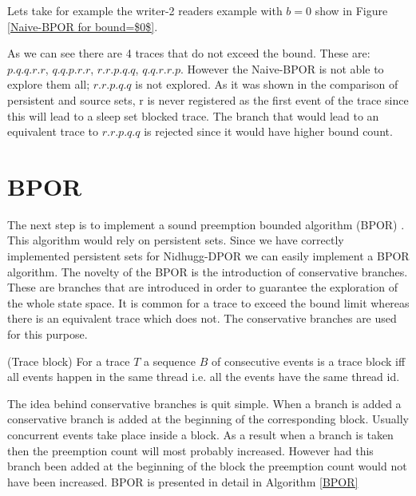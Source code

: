 Lets take for example the writer-2 readers example with $b=0$ show in Figure \ref{Naive-BPOR for bound=$0$}. 

\label{Vanilla0}    

As we can see there are 4 traces that do not exceed the bound. These are:
$p.q.q.r.r$, $q.q.p.r.r$, $r.r.p.q.q$, $q.q.r.r.p$.
However the Naive-BPOR is not able to explore them all; $r.r.p.q.q$ is not explored.
As it was shown in the comparison of persistent and source sets, r is never registered as the first event of the trace
since this will lead to a sleep set blocked trace. The branch that would lead to an equivalent trace to $r.r.p.q.q$ is rejected
since it would have higher bound count.

\section{BPOR}

The next step is to implement a sound preemption bounded algorithm (BPOR) \cite{BPOR}. This algorithm would rely on persistent sets.
Since we have correctly implemented persistent sets for Nidhugg-DPOR we can easily implement a BPOR algorithm. The novelty of the BPOR is the introduction of conservative branches. These
are branches that are introduced in order to guarantee the exploration of the whole state space. It is common for a trace to exceed the bound limit whereas there is
an equivalent trace which does not. The conservative branches are used for this purpose.

\begin{definition}{(Trace block)}
For a trace $T$ a sequence $B$ of consecutive events is a trace block iff all events happen in the same thread i.e. all the events have the same thread id.
\end{definition}

The idea behind conservative branches is quit simple. When a branch is added a conservative branch is added at the beginning of the corresponding block.
Usually concurrent events take place inside a block. As a result when a branch is taken then the preemption count will most probably increased. However had this
branch been added at the beginning of the block the preemption count would not have been increased. BPOR is presented in detail in Algorithm \ref{BPOR} 


